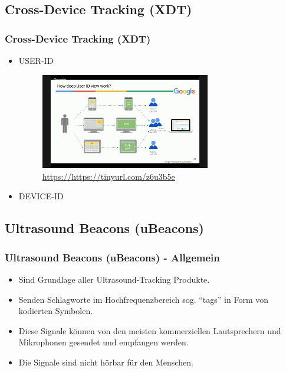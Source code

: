 \documentclass{beamer}
\begin{document}
	\subsection{Cross-Device Tracking (XDT)}	
		\begin{frame}\frametitle{Cross-Device Tracking (XDT)}
		\begin{itemize}
			\item USER-ID
		\begin{figure}[h]
			\centering
			\includegraphics[width=0.7\textwidth]{graphics/userIdTracking.jpg}\\
			\tiny\url{https://https://tinyurl.com/z6u3b5e}
		\end{figure}	
		\item DEVICE-ID
		\end{itemize}
		\end{frame}


	\subsection{Ultrasound Beacons (uBeacons)}		
		\begin{frame}\frametitle{Ultrasound Beacons (uBeacons) - Allgemein}
		\begin{itemize}
			\item Sind Grundlage aller Ultrasound-Tracking Produkte.
			\item Senden Schlagworte im Hochfrequenzbereich sog. "`tags"' in Form von kodierten Symbolen.
			\item Diese Signale können von den meisten kommerziellen Lautsprechern und Mikrophonen gesendet und empfangen werden.
			\item Die Signale sind nicht hörbar für den Menschen.
		\end{itemize}
		\end{frame}
		
\end{document}
